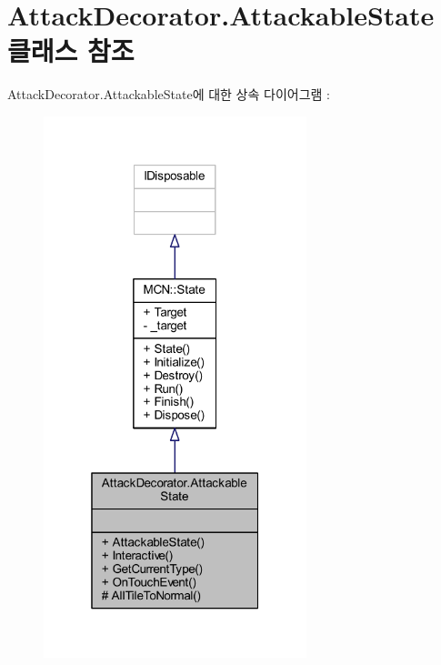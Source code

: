\hypertarget{class_attack_decorator_1_1_attackable_state}{}\section{Attack\+Decorator.\+Attackable\+State 클래스 참조}
\label{class_attack_decorator_1_1_attackable_state}


Attack\+Decorator.\+Attackable\+State에 대한 상속 다이어그램 \+: 
\nopagebreak
\begin{figure}[H]
\begin{center}
\leavevmode
\includegraphics[width=217pt]{class_attack_decorator_1_1_attackable_state__inherit__graph}
\end{center}
\end{figure}


